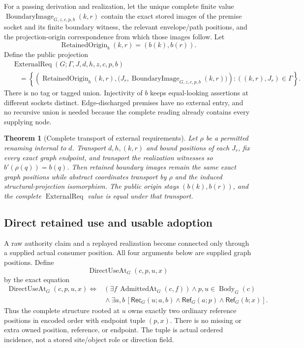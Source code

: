 \documentclass[11pt,twoside]{article}
\newcommand{\Rec}{\mathsf{Rec}}
\newcommand{\RefPos}{\mathsf{Ref}}
\newtheorem{theorem}{Theorem}
\begin{document}
For a passing derivation and realization, let the unique complete finite value
\(\operatorname{BoundaryImage}_{G,z,c,p,b}(k,r)\) contain the exact stored images
of the premise socket and its finite boundary witness, the relevant envelope/path
positions, and the projection-origin correspondence from which those images follow.
Let
\[
  \operatorname{RetainedOrigin}_{b}(k,r)=(b(k),b(r)).
\]
Define the public projection
\[
\begin{split}
 &\operatorname{ExternalReq}
       (G;\Gamma,J,d,h,z,c,p,b)\\
 &\quad=
 \left\{
 \left(
  \operatorname{RetainedOrigin}_{b}(k,r),
  \bigl(J_r,\operatorname{BoundaryImage}_{G,z,c,p,b}(k,r)\bigr)
 \right):
 ((k,r),J_r)\in\Gamma
 \right\}.
\end{split}
\]
There is no tag or tagged union.  Injectivity of \(b\) keeps equal-looking
assertions at different sockets distinct.  Edge-discharged premises have no
external entry, and no recursive union is needed because the complete reading
already contains every supplying node.

\begin{theorem}[Complete transport of external requirements]%
\label{thm:external-transport}
Let \(\rho\) be a permitted renaming internal to \(d\).  Transport \(d,h,(k,r)\)
and bound positions of each \(J_r\), fix every exact graph endpoint, and transport
the realization witnesses so \(b'(\rho(q))=b(q)\).  Then retained boundary images
remain the same exact graph positions while abstract coordinates transport by
\(\rho\) and the induced structural-projection isomorphism.  The public origin stays
\((b(k),b(r))\), and the complete \(\operatorname{ExternalReq}\) value is equal
under that transport.
\end{theorem}

\subsection{Direct retained use and usable adoption}

A raw authority claim and a replayed realization become connected only through a
supplied actual consumer position.  All four arguments below are supplied graph
positions.  Define
\[
  \operatorname{DirectUseAt}_G(c,p,u,x)
\]
by the exact equation
\[
\begin{split}
 \operatorname{DirectUseAt}_G(c,p,u,x)\Longleftrightarrow{}&
 (\exists f\,\operatorname{AdmittedAt}_G(c,f))
       \land p,u\in\operatorname{Body}_G(c)\\
 &{}\land\exists a,b\,[\Rec_G(u;a,b)
                    \land\RefPos_G(a;p)\land\RefPos_G(b;x)].
\end{split}
\]
Thus the complete structure rooted at \(u\) owns exactly two ordinary reference
positions in encoded order with endpoint tuple \((p,x)\).  There is no missing or
extra owned position, reference, or endpoint.  The tuple is actual ordered
incidence, not a stored site/object role or direction field.
\end{document}
